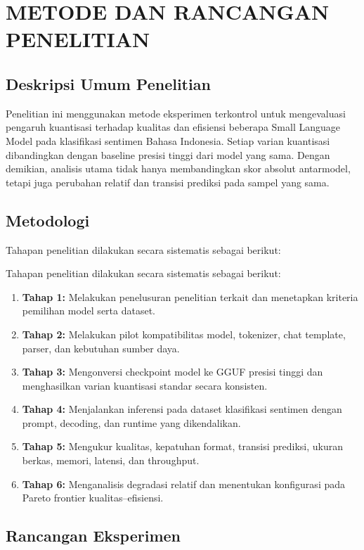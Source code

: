 \chapter{METODE DAN RANCANGAN PENELITIAN}

\section{Deskripsi Umum Penelitian}

Penelitian ini menggunakan metode eksperimen terkontrol untuk mengevaluasi pengaruh kuantisasi terhadap kualitas dan efisiensi beberapa Small Language Model pada klasifikasi sentimen Bahasa Indonesia. Setiap varian kuantisasi dibandingkan dengan baseline presisi tinggi dari model yang sama. Dengan demikian, analisis utama tidak hanya membandingkan skor absolut antarmodel, tetapi juga perubahan relatif dan transisi prediksi pada sampel yang sama.

\section{Metodologi}

Tahapan penelitian dilakukan secara sistematis sebagai berikut:

Tahapan penelitian dilakukan secara sistematis sebagai berikut:

\begin{enumerate}
    \item \textbf{Tahap 1:} Melakukan penelusuran penelitian terkait dan menetapkan kriteria pemilihan model serta dataset.
    \item \textbf{Tahap 2:} Melakukan pilot kompatibilitas model, tokenizer, chat template, parser, dan kebutuhan sumber daya.
    \item \textbf{Tahap 3:} Mengonversi checkpoint model ke GGUF presisi tinggi dan menghasilkan varian kuantisasi standar secara konsisten.
    \item \textbf{Tahap 4:} Menjalankan inferensi pada dataset klasifikasi sentimen dengan prompt, decoding, dan runtime yang dikendalikan.
    \item \textbf{Tahap 5:} Mengukur kualitas, kepatuhan format, transisi prediksi, ukuran berkas, memori, latensi, dan throughput.
    \item \textbf{Tahap 6:} Menganalisis degradasi relatif dan menentukan konfigurasi pada Pareto frontier kualitas--efisiensi.
\end{enumerate}

\section{Rancangan Eksperimen}

